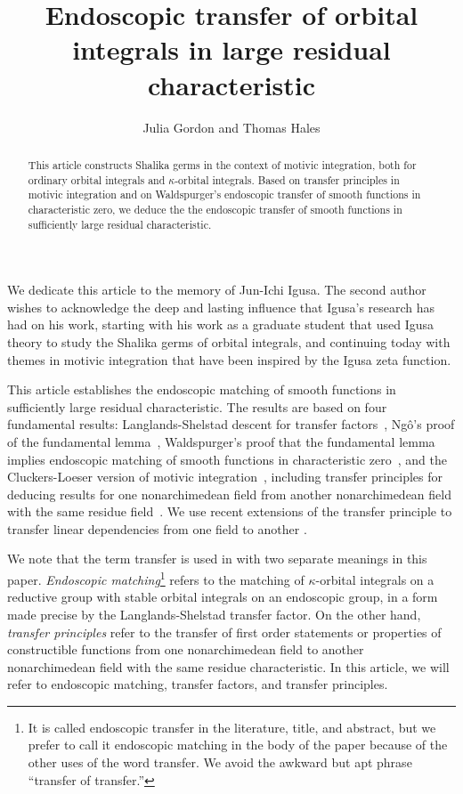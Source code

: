 \documentclass[12pt]{amsart}
\title{Endoscopic transfer of orbital integrals in large residual characteristic}
\author{Julia Gordon and Thomas Hales}
\theoremstyle{plain}
\theoremstyle{definition}
\begin{document}
\begin{abstract} This article constructs Shalika germs in the context
  of motivic integration, both for ordinary orbital integrals and
  $\kappa$-orbital integrals.  Based on transfer principles in motivic
  integration and on Waldspurger's endoscopic transfer of smooth
  functions in characteristic zero, we deduce the the endoscopic
  transfer of smooth functions in sufficiently large residual
  characteristic.
\end{abstract}



\maketitle
\linenumbers


We dedicate this article to the memory of Jun-Ichi Igusa.  The second
author wishes to acknowledge the deep and lasting influence that
Igusa's research has had on his work, starting with his work as a
graduate student that used Igusa theory to study the Shalika germs of
orbital integrals, and continuing today with themes in motivic
integration that have been inspired by the Igusa zeta function.

\bigskip

This article establishes the endoscopic matching of smooth functions
in sufficiently large residual characteristic.  The results are based
on four fundamental results: Langlands-Shelstad descent for transfer
factors~\cite{LSxf}, Ng\^o's proof of the fundamental
lemma~\cite{NBC}, Waldspurger's proof that the fundamental lemma
implies endoscopic matching of smooth functions in characteristic
zero~\cite{W}, and the Cluckers-Loeser version of motivic
integration~\cite{CL}, including transfer principles for deducing
results for one nonarchimedean field from another nonarchimedean field
with the same residue field~\cite{CLe}.  We use recent extensions of
the transfer principle to transfer linear dependencies from one field
to another \cite{CGH2}.

We note that the term transfer is used in with two separate meanings
in this paper.  {\it Endoscopic matching}\footnote{It is called
  endoscopic transfer in the literature, title, and abstract, but we
  prefer to call it endoscopic matching in the body of the paper
  because of the other uses of the word transfer. We avoid the awkward
  but apt phrase ``transfer of transfer.''}
refers to the matching of $\kappa$-orbital integrals on a reductive
group with stable orbital integrals on an endoscopic group, in a form
made precise by the Langlands-Shelstad transfer factor.  On the other
hand, {\it transfer principles} refer to the transfer of first order
statements or properties of constructible functions from one
nonarchimedean field to another nonarchimedean field with the same
residue characteristic.  In this article, we will refer to endoscopic
matching,
transfer factors, and transfer principles.
\end{document}
